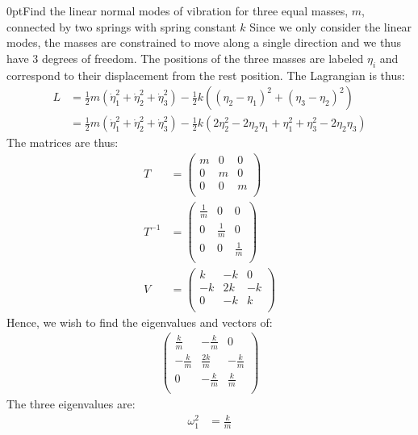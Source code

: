 \begin{example}{0pt}{Find the linear normal modes of vibration for three equal masses, $m$, connected by two springs with spring constant $k$}{}
Since we only consider the linear modes, the masses are constrained to move along a single direction and we thus have 3 degrees of freedom. The positions of the three masses are labeled $\eta_i$ and correspond to their displacement from  the rest position. The Lagrangian is thus:
\begin{align*}
L&=\frac{1}{2}m(\dot\eta_1^2+\dot\eta_2^2+\dot\eta_3^2)-\frac{1}{2}k\left((\eta_2-\eta_1)^2+(\eta_3-\eta_2)^2  \right)\nonumber\\
&=\frac{1}{2}m(\dot\eta_1^2+\dot\eta_2^2+\dot\eta_3^2)-\frac{1}{2}k(2\eta_2^2-2\eta_2\eta_1+\eta_1^2+\eta_3^2-2\eta_2\eta_3)
\end{align*}
The matrices are thus: 
\begin{align}
T&= \left( \begin{array}{ccc}
m &0 &0\\
0 &m &0\\
0 &0 &m\\
\end{array}      \right) \nonumber\\
T^{-1}&= \left( \begin{array}{ccc}
\frac{1}{m} &0 &0\\
0 &\frac{1}{m} &0\\
0 &0 &\frac{1}{m}\\
\end{array}      \right) \nonumber\\
V&= \left( \begin{array}{ccc}
k &-k &0\\
-k &2k &-k\\
0 &-k &k\\
\end{array}      \right)
\end{align}
Hence, we wish to find the eigenvalues and vectors of:
\begin{align*}
\left( \begin{array}{ccc}
\frac{k}{m} &-\frac{k}{m} &0\\
-\frac{k}{m} &\frac{2k}{m} &-\frac{k}{m}\\
0 &-\frac{k}{m} &\frac{k}{m}\\
\end{array}      \right)
\end{align*}
The three eigenvalues are:
\begin{align*}
\omega_1^2&=\frac{k}{m}\\

\end{align*}
\end{example}
